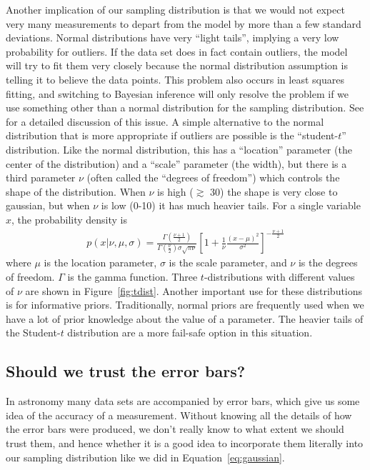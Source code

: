 Another implication of our sampling distribution is that we would not expect
very many measurements to depart from the model by more than a few standard
deviations. Normal distributions have very ``light tails'', implying a very
low probability for outliers. If the data set does in fact contain outliers,
the model will try to fit them very closely because the normal distribution
assumption is telling it to believe the data points. This problem also occurs
in least squares fitting, and switching to Bayesian inference will only resolve
the problem if we use something other than a normal distribution for the
sampling distribution. See \citet{hoggline} for a detailed discussion of this
issue. A simple alternative to the normal distribution that is more appropriate
if outliers are possible is the ``student-$t$'' distribution. Like the normal
distribution, this has a ``location'' parameter (the center of the distribution)
and a ``scale'' parameter (the width), but there is a third parameter $\nu$
(often called the ``degrees of freedom'')
which controls the shape of the distribution. When $\nu$ is high ($\gtrsim$ 30)
the shape is very close to gaussian, but when $\nu$ is low (0-10) it has much
heavier tails. For a single variable $x$, the probability density is
\begin{eqnarray}
p(x|\nu, \mu, \sigma) = \frac{\Gamma\left(\frac{\nu + 1}{2}\right)}
{\Gamma\left(\frac{\nu}{2}\right)\sigma\sqrt{\pi\nu}}
\left[1 + \frac{1}{\nu}\frac{(x - \mu)^2}{\sigma^2}
\right]^{-\frac{\nu + 1}{2}}
\end{eqnarray}
where $\mu$ is the location parameter, $\sigma$ is the scale parameter, and
$\nu$ is the degrees of freedom. $\Gamma$ is the gamma function. Three
$t$-distributions with different values of $\nu$ are shown in
Figure~\ref{fig:tdist}. Another important use for these distributions is for
informative priors. Traditionally, normal priors are frequently used when we
have a lot of prior knowledge about the value of a parameter. The heavier tails
of the Student-$t$ distribution are a more fail-safe option in this situation.

\subsection{Should we trust the error bars?}
In astronomy many data sets are accompanied by error bars, which give us some
idea of the accuracy of a measurement. Without knowing all the details of how
the error bars were produced, we don't really know to what extent we should
trust them, and hence whether it is a good idea to
incorporate them literally into our sampling distribution like
we did in Equation~\ref{eq:gaussian}.

